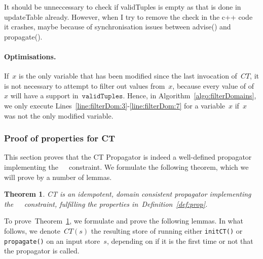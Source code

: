 \documentclass[a4paper,11pt]{article}
\newtheorem{theorem}{Theorem}[section]
\newcommand{\T}[1]{\texttt{#1}}
\newcommand{\Todo}[1]{{\color{blue}#1}}
\newcommand{\Algoref}[1]{Algorithm~\ref{#1}}
\newcommand{\Table}{\Constraint{Table}~}
\newcommand{\Linesref}[2]{Lines~\ref{#1}-\ref{#2}}
\newcommand{\Defref}[1]{Definition~\ref{#1}}
\newcommand{\Thmref}[1]{Theorem~\ref{#1}}
\newcommand{\CurrTable}{\texttt{validTuples}}
\numberwithin{equation}{section}
\begin{document}
\Todo{It should be unneccessary to check if validTuples is empty
  as that is done in updateTable already. However, when I try to
  remove the check in the c++ code it crashes, maybe because of
  synchronisation issues between advise() and propagate().}

\begin{algorithm}[H]
  \begin{algorithmic}[1]  %
    
  \end{algorithmic}
  \caption{Method propagate() in Class CT-Propagator. updateTable()
    (\Algoref{algo:updateTable}) is
  called, and if the current table is empty, we are in a failed node.
  Otherwise, filterDomains() (\Algoref{algo:filterDomains})
  is called, and the return value of that method is returned.}
  \label{algo:propagate}
\end{algorithm}

\paragraph{Optimisations.} If~$x$ is the only variable
that has been modified since the last invocation of~$CT$, it is
not necessary to attempt to filter out values from~$x$, because
every value of of~$x$ will have a support in~$\CurrTable$.
Hence, in \Algoref{algo:filterDomains}, we only execute
\Linesref{line:filterDom:3}{line:filterDom:7} for a variable~$x$
if~$x$ was not the only modified variable.

 
\subsubsection{Proof of properties for CT}
This section proves that the CT Propagator is indeed a well-defined propagator
implementing the~\Table~constraint. We formulate the following theorem, which
we will prove by a number of lemmas.

\begin{theorem} \label{thm:prop}
  CT is an idempotent, domain consistent propagator implementing 
  the~\Table~constraint, fulfilling the properties in~\Defref{def:prop}.
\end{theorem}

To prove~\Thmref{thm:prop}, we formulate and prove the following lemmas.
In what follows, we denote~$CT(s)$ the resulting store of running 
either \T{initCT()} or \texttt{propagate()} on an input store~$s$,
depending on if it is the first time or not that the propagator is called.
\end{document}

